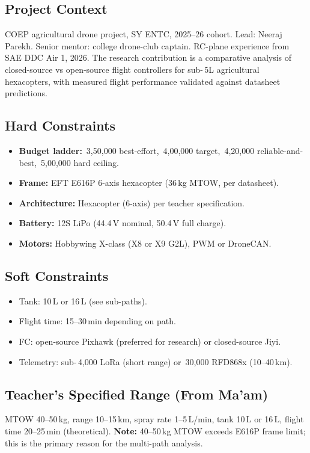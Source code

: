 \documentclass[11pt,a4paper]{article}
\newcommand{\Rs}{\rupee\,}
\begin{document}
\subsection{Project Context}
COEP agricultural drone project, SY ENTC, 2025--26 cohort. Lead: Neeraj Parekh. Senior mentor: college drone-club captain. RC-plane experience from SAE DDC Air 1, 2026. The research contribution is a comparative analysis of closed-source vs open-source flight controllers for sub-\Rs{}5L agricultural hexacopters, with measured flight performance validated against datasheet predictions.

\subsection{Hard Constraints}
\begin{itemize}
  \item \textbf{Budget ladder:} \Rs{}3,50,000 best-effort, \Rs{}4,00,000 target, \Rs{}4,20,000 reliable-and-best, \Rs{}5,00,000 hard ceiling.
  \item \textbf{Frame:} EFT E616P 6-axis hexacopter (36\,kg MTOW, per datasheet).
  \item \textbf{Architecture:} Hexacopter (6-axis) per teacher specification.
  \item \textbf{Battery:} 12S LiPo (44.4\,V nominal, 50.4\,V full charge).
  \item \textbf{Motors:} Hobbywing X-class (X8 or X9 G2L), PWM or DroneCAN.
\end{itemize}

\subsection{Soft Constraints}
\begin{itemize}
  \item Tank: 10\,L or 16\,L (see sub-paths).
  \item Flight time: 15--30\,min depending on path.
  \item FC: open-source Pixhawk (preferred for research) or closed-source Jiyi.
  \item Telemetry: sub-\Rs{}4,000 LoRa (short range) or \Rs{}30,000 RFD868x (10--40\,km).
\end{itemize}

\subsection{Teacher's Specified Range (From Ma'am)}
MTOW 40--50\,kg, range 10--15\,km, spray rate 1--5\,L/min, tank 10\,L or 16\,L, flight time 20--25\,min (theoretical). \textbf{Note:} 40--50\,kg MTOW exceeds E616P frame limit; this is the primary reason for the multi-path analysis.
\end{document}
